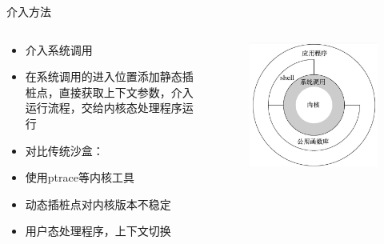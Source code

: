 \documentclass[UTF8,fontset=macnew,xcolor=table]{ctexbeamer}
\begin{document}
\begin{frame}{介入方法}
    \begin{columns}
        \begin{column}{0.7\textwidth}
            \begin{itemize}
                \item 介入系统调用
                \item 在系统调用的进入位置添加静态插桩点，直接获取上下文参数，介入运行流程，交给内核态处理程序运行\\
                
                \item 对比传统沙盒：
                \item 使用ptrace等内核工具
                \item 动态插桩点对内核版本不稳定
                \item 用户态处理程序，上下文切换
            \end{itemize}
        \end{column}

        \begin{column}{0.3\textwidth}
            \begin{figure}[H]
                \centering
                \includegraphics[width=\columnwidth]{pic5.png}
            \end{figure}
        \end{column}
    \end{columns}
\end{frame}
\end{document}

